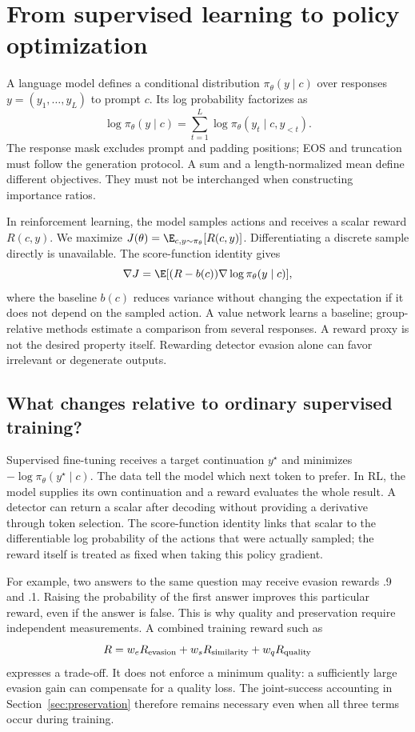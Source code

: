 \section{From supervised learning to policy optimization}
\label{app:rl}
A language model defines a conditional distribution $\pi_\theta(y\mid c)$ over responses $y=(y_1,\ldots,y_L)$ to prompt $c$. Its log probability factorizes as
\begin{equation}
\log\pi_\theta(y\mid c)=\sum_{t=1}^{L}\log\pi_\theta(y_t\mid c,y_{<t}).
\end{equation}
The response mask excludes prompt and padding positions; EOS and truncation must follow the generation protocol. A sum and a length-normalized mean define different objectives. They must not be interchanged when constructing importance ratios.

In reinforcement learning, the model samples actions and receives a scalar reward $R(c,y)$. We maximize $J(\theta)=\E_{c,y\sim\pi_\theta}[R(c,y)]$. Differentiating a discrete sample directly is unavailable. The score-function identity gives
\begin{equation}
\nabla J=\E[(R-b(c))\nabla\log\pi_\theta(y\mid c)],
\end{equation}
where the baseline $b(c)$ reduces variance without changing the expectation if it does not depend on the sampled action. A value network learns a baseline; group-relative methods estimate a comparison from several responses. A reward proxy is not the desired property itself. Rewarding detector evasion alone can favor irrelevant or degenerate outputs.

\subsection{What changes relative to ordinary supervised training?}
Supervised fine-tuning receives a target continuation $y^\star$ and minimizes $-\log\pi_\theta(y^\star\mid c)$. The data tell the model which next token to prefer. In RL, the model supplies its own continuation and a reward evaluates the whole result. A detector can return a scalar after decoding without providing a derivative through token selection. The score-function identity links that scalar to the differentiable log probability of the actions that were actually sampled; the reward itself is treated as fixed when taking this policy gradient.

For example, two answers to the same question may receive evasion rewards .9 and .1. Raising the probability of the first answer improves this particular reward, even if the answer is false. This is why quality and preservation require independent measurements. A combined training reward such as
\begin{equation}
 R=w_eR_{\rm evasion}+w_sR_{\rm similarity}+w_qR_{\rm quality}
\end{equation}
expresses a trade-off. It does not enforce a minimum quality: a sufficiently large evasion gain can compensate for a quality loss. The joint-success accounting in Section~\ref{sec:preservation} therefore remains necessary even when all three terms occur during training.

